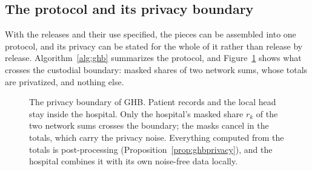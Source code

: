 \documentclass[acmsmall,screen,review]{acmart}
\theoremstyle{acmdefinition}
\begin{document}
\subsection{The protocol and its privacy boundary}\label{sec:algorithm}

With the releases and their use specified, the pieces can be assembled into one protocol, and its privacy can be stated for the whole of it rather than release by release. Algorithm~\ref{alg:ghb} summarizes the protocol, and Figure~\ref{fig:boundary} shows what crosses the custodial boundary: masked shares of two network sums, whose totals are privatized, and nothing else.

\begin{figure}[t]
\centering
\resizebox{\linewidth}{!}{}
\caption{The privacy boundary of GHB. Patient records and the local head stay inside the hospital. Only the hospital's masked share $r_k$ of the two network sums crosses the boundary; the masks cancel in the totals, which carry the privacy noise. Everything computed from the totals is post-processing (Proposition~\ref{prop:ghbprivacy}), and the hospital combines it with its own noise-free data locally.}
\label{fig:boundary}
\end{figure}
\end{document}
